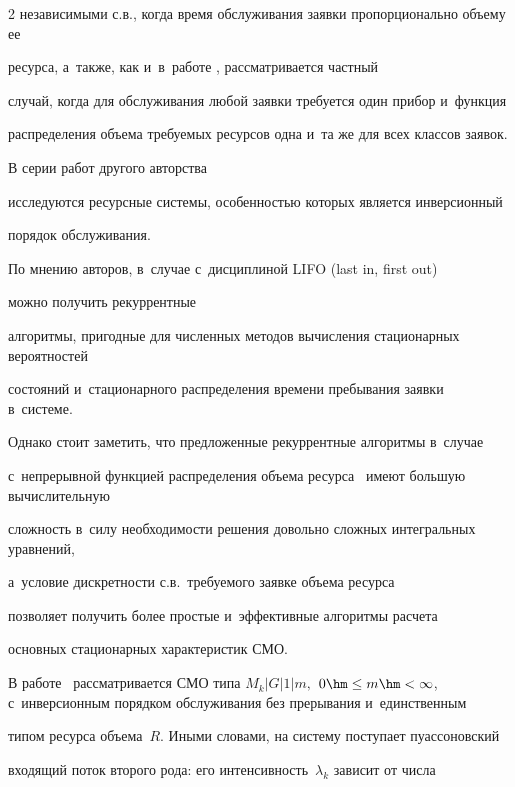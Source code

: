 \begin{multicols}{2}
независимыми с.в., когда время обслуживания заявки пропорционально объему ее 


ресурса, а~также, как и~в~работе \cite{Romm_21_1971}, рассматривается частный 


случай, когда для обслуживания любой заявки требуется один прибор и~функция 


распределения объема требуемых ресурсов одна и~та же для всех классов заявок.





В серии работ другого авторства~\cite{Pechinkin_28_2011,Pechinkin_29_2012,Pechinkin_30_1998,Pechinkin_31_1999} 


исследуются ресурсные сис\-те\-мы, особенностью которых является инверсионный 


порядок обслуживания.


По мнению авторов, в~случае с~дисциплиной LIFO (last in, first out)


можно получить рекуррентные 


алгоритмы, пригодные для численных методов вычисления стационарных вероятностей 


состояний и~стационарного распределения времени пребывания заявки в~сис\-те\-ме. 


Однако стоит заметить, что предложенные рекуррентные алгоритмы в~случае 


с~непрерывной функцией распределения объема ресурса~\cite{Pechinkin_30_1998,Pechinkin_31_1999} имеют большую вычислительную 


сложность в~силу необходимости решения довольно сложных интегральных уравнений, 


а~условие дискретности с.в.\ требуемого заявке объема ресурса~\cite{Pechinkin_28_2011,Pechinkin_29_2012} 


позволяет получить более прос\-тые и~эффективные алгоритмы расчета 


основных стационарных характеристик СМО.





В работе~\cite{Pechinkin_30_1998} рассматривается СМО типа $M_k|G|1|m,$ $0\hm\leq m 


\hm<\infty$, с~инверсионным порядком обслуживания без прерывания и~единственным 


типом ресурса объема~$R$. Иными словами, на сис\-те\-му поступает пуассоновский 


входящий поток второго рода: его интенсивность~$\lambda_k$ зависит от числа 



\end{multicols}
